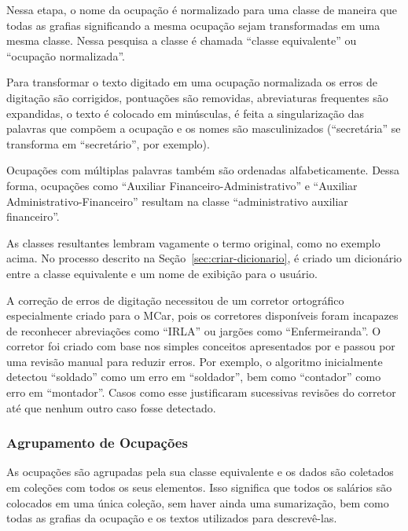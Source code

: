 \documentclass[12pt,a4paper]{article}
\begin{document}
Nessa etapa, o nome da ocupação é normalizado para uma classe de maneira que todas as grafias significando a mesma ocupação sejam transformadas em uma mesma classe. Nessa pesquisa a classe é chamada \enquote{classe equivalente} ou \enquote{ocupação normalizada}.

Para transformar o texto digitado em uma ocupação normalizada os erros de digitação são corrigidos, pontuações são removidas, abreviaturas frequentes são expandidas, o texto é colocado em minúsculas, é feita a singularização das palavras que compõem a ocupação e os nomes são masculinizados (\enquote{secretária} se transforma em \enquote{secretário}, por exemplo).

Ocupações com múltiplas palavras também são ordenadas alfabeticamente. Dessa forma, ocupações como \enquote{Auxiliar Financeiro-Administrativo} e \enquote{Auxiliar Administrativo-Financeiro} resultam na classe \enquote{administrativo auxiliar financeiro}.

As classes resultantes lembram vagamente o termo original, como no exemplo acima. No processo descrito na Seção~\ref{sec:criar-dicionario}, é criado um dicionário entre a classe equivalente e um nome de exibição para o usuário.

A correção de erros de digitação necessitou de um corretor ortográfico especialmente criado para o MCar, pois os corretores disponíveis foram incapazes de reconhecer abreviações como \enquote{IRLA} ou jargões como \enquote{Enfermeiranda}. O corretor foi criado com base nos simples conceitos apresentados por  e passou por uma revisão manual para reduzir erros. Por exemplo, o algoritmo inicialmente detectou \enquote{soldado} como um erro em \enquote{soldador}, bem como \enquote{contador} como erro em \enquote{montador}. Casos como esse justificaram sucessivas revisões do corretor até que nenhum outro caso fosse detectado.


\subsubsection{Agrupamento de Ocupações} \label{sec:agrupamento-de-ocupacoes}

As ocupações são agrupadas pela sua classe equivalente e os dados são coletados em coleções com todos os seus elementos. Isso significa que todos os salários são colocados em uma única coleção, sem haver ainda uma sumarização, bem como todas as grafias da ocupação e os textos utilizados para descrevê-las.
\end{document}
